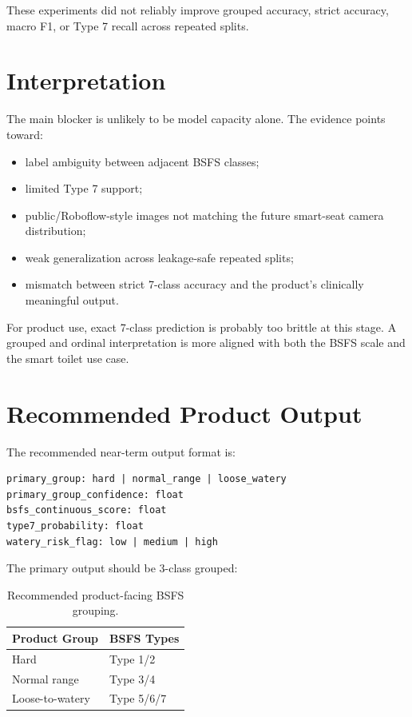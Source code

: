 \documentclass[11pt]{article}
\begin{document}
These experiments did not reliably improve grouped accuracy, strict accuracy, macro F1, or Type 7 recall across repeated splits.

\section{Interpretation}

The main blocker is unlikely to be model capacity alone. The evidence points toward:

\begin{itemize}
    \item label ambiguity between adjacent BSFS classes;
    \item limited Type 7 support;
    \item public/Roboflow-style images not matching the future smart-seat camera distribution;
    \item weak generalization across leakage-safe repeated splits;
    \item mismatch between strict 7-class accuracy and the product's clinically meaningful output.
\end{itemize}

For product use, exact 7-class prediction is probably too brittle at this stage. A grouped and ordinal interpretation is more aligned with both the BSFS scale and the smart toilet use case.

\section{Recommended Product Output}

The recommended near-term output format is:

\begin{verbatim}
primary_group: hard | normal_range | loose_watery
primary_group_confidence: float
bsfs_continuous_score: float
type7_probability: float
watery_risk_flag: low | medium | high
\end{verbatim}

The primary output should be 3-class grouped:

\begin{table}[h]
\centering
\begin{tabular}{ll}
\toprule
Product Group & BSFS Types \\
\midrule
Hard & Type 1/2 \\
Normal range & Type 3/4 \\
Loose-to-watery & Type 5/6/7 \\
\bottomrule
\end{tabular}
\caption{Recommended product-facing BSFS grouping.}
\end{table}
\end{document}
